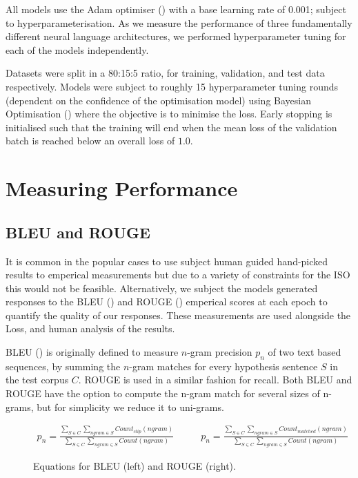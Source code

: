 \documentclass[12pt,twoside]{report}
\begin{document}
All models use the Adam optimiser (\cite{kingma_adam:_2014}) with a base learning rate of 0.001; subject to hyperparameterisation. As we measure the performance of three fundamentally different neural language architectures, we performed hyperparameter tuning for each of the models independently.

Datasets were split in a 80:15:5 ratio, for training, validation, and test data respectively. Models were subject to roughly 15 hyperparameter tuning rounds (dependent on the confidence of the optimisation model) using Bayesian Optimisation (\cite{gpyopt_authors_gpyopt:_2016}) where the objective is to minimise the loss. Early stopping is initialised such that the training will end when the mean loss of the validation batch is reached below an overall loss of $1.0$. 

\section{Measuring Performance}

\subsection{BLEU and ROUGE}

It is common in the popular cases to use subject human guided hand-picked results to emperical measurements but due to a variety of constraints for the ISO this would not be feasible. Alternatively, we subject the models generated responses to the BLEU (\cite{papineni_bleu:_2001}) and ROUGE (\cite{lin_rouge:_2004}) emperical scores at each epoch to quantify the quality of our responses. These measurements are used alongside the Loss, and human analysis of the results.

BLEU (\cite{papineni_bleu:_2001}) is originally defined to measure $n$-gram precision $p_n$ of two text based sequences, by summing the $n$-gram matches for every hypothesis sentence $S$ in the test corpus $C$. ROUGE is used in a similar fashion for recall. Both BLEU and ROUGE have the option to compute the n-gram match for several sizes of n-grams, but for simplicity we reduce it to uni-grams.

\begin{figure}[!ht]
	\begin{equation}
		\begin{split}
			p_n = \frac
			{\sum_{S\in C} \sum_{ngram\in S} Count_{clip}(ngram)}
			{\sum_{S\in C} \sum_{ngram\in S} Count(ngram)}
		\end{split}
		\quad\quad
		\begin{split}
			p_n = \frac
			{\sum_{S\in C} \sum_{ngram\in S} Count_{matched}(ngram)}
			{\sum_{S\in C} \sum_{ngram\in S} Count(ngram)}
		\end{split}
	\end{equation}
	\caption{Equations for BLEU (left) and ROUGE (right).}
	\end{figure}
\end{document}
